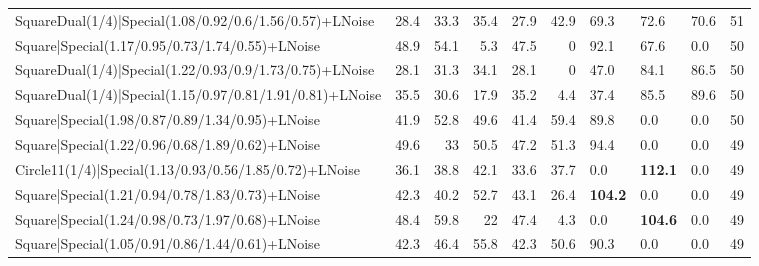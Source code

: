 \begin{tabular}{lrrrrrlllr}
 SquareDual(1/4)|Special(1.08/0.92/0.6/1.56/0.57)+LNoise         &            28.4 &            33.3 &            35.4 &            27.9 &           42.9 & 69.3            & 72.6           & 70.6           &           51 \\
 Square|Special(1.17/0.95/0.73/1.74/0.55)+LNoise                 &            48.9 &            54.1 &             5.3 &            47.5 &            0   & 92.1            & 67.6           & 0.0            &           50 \\
 SquareDual(1/4)|Special(1.22/0.93/0.9/1.73/0.75)+LNoise         &            28.1 &            31.3 &            34.1 &            28.1 &            0   & 47.0            & 84.1           & 86.5           &           50 \\
 SquareDual(1/4)|Special(1.15/0.97/0.81/1.91/0.81)+LNoise        &            35.5 &            30.6 &            17.9 &            35.2 &            4.4 & 37.4            & 85.5           & 89.6           &           50 \\
 Square|Special(1.98/0.87/0.89/1.34/0.95)+LNoise                 &            41.9 &            52.8 &            49.6 &            41.4 &           59.4 & 89.8            & 0.0            & 0.0            &           50 \\
 Square|Special(1.22/0.96/0.68/1.89/0.62)+LNoise                 &            49.6 &            33   &            50.5 &            47.2 &           51.3 & 94.4            & 0.0            & 0.0            &           49 \\
 Circle11(1/4)|Special(1.13/0.93/0.56/1.85/0.72)+LNoise          &            36.1 &            38.8 &            42.1 &            33.6 &           37.7 & 0.0             & \textbf{112.1} & 0.0            &           49 \\
 Square|Special(1.21/0.94/0.78/1.83/0.73)+LNoise                 &            42.3 &            40.2 &            52.7 &            43.1 &           26.4 & \textbf{104.2}  & 0.0            & 0.0            &           49 \\
 Square|Special(1.24/0.98/0.73/1.97/0.68)+LNoise                 &            48.4 &            59.8 &            22   &            47.4 &            4.3 & 0.0             & \textbf{104.6} & 0.0            &           49 \\
 Square|Special(1.05/0.91/0.86/1.44/0.61)+LNoise                 &            42.3 &            46.4 &            55.8 &            42.3 &           50.6 & 90.3            & 0.0            & 0.0            &           49 \\

\end{tabular}
